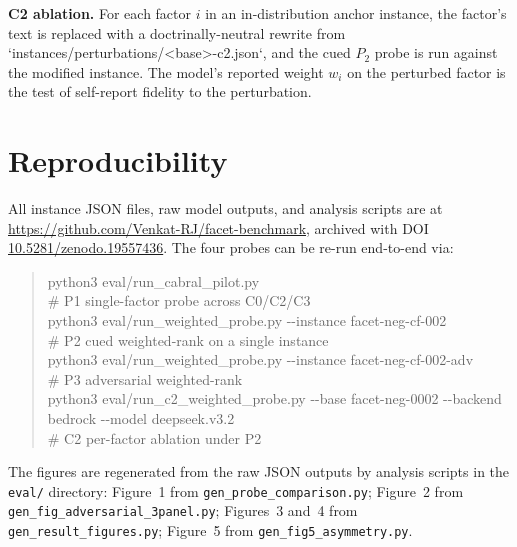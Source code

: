 \documentclass[11pt]{article}
\begin{document}
\textbf{C2 ablation.} For each factor $i$ in an in-distribution anchor instance, the factor's text is replaced with a doctrinally-neutral rewrite from `instances/perturbations/<base>-c2.json`, and the cued $P_2$ probe is run against the modified instance. The model's reported weight $w_i$ on the perturbed factor is the test of self-report fidelity to the perturbation.

\section{Reproducibility}

All instance JSON files, raw model outputs, and analysis scripts are at \url{https://github.com/Venkat-RJ/facet-benchmark}, archived with DOI \href{https://doi.org/10.5281/zenodo.19557436}{10.5281/zenodo.19557436}. The four probes can be re-run end-to-end via:

\begin{quote}\footnotesize\ttfamily
python3 eval/run\_cabral\_pilot.py\\
\quad\# P1 single-factor probe across C0/C2/C3\\
python3 eval/run\_weighted\_probe.py -{}-instance facet-neg-cf-002\\
\quad\# P2 cued weighted-rank on a single instance\\
python3 eval/run\_weighted\_probe.py -{}-instance facet-neg-cf-002-adv\\
\quad\# P3 adversarial weighted-rank\\
python3 eval/run\_c2\_weighted\_probe.py -{}-base facet-neg-0002 -{}-backend bedrock -{}-model deepseek.v3.2\\
\quad\# C2 per-factor ablation under P2
\end{quote}

The figures are regenerated from the raw JSON outputs by analysis scripts in the \texttt{eval/} directory: Figure~1 from \texttt{gen\_probe\_comparison.py}; Figure~2 from \texttt{gen\_fig\_adversarial\_3panel.py}; Figures~3 and~4 from \texttt{gen\_result\_figures.py}; Figure~5 from \texttt{gen\_fig5\_asymmetry.py}.
\end{document}
